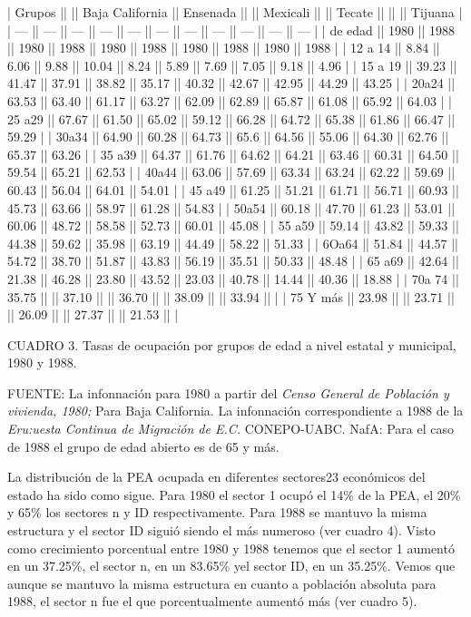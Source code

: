 \documentclass{article}
\begin{document}
| Grupos   ||       || Baja California || Ensenada ||       || Mexicali ||       || Tecate ||       ||       || Tijuana |
| ---      || ---   || ---             || ---      || ---   || ---      || ---   || ---    || ---   || ---   || ---     |
| de edad  || 1980  || 1988            || 1980     || 1988  || 1980     || 1988  || 1980   || 1988  || 1980  || 1988    |
| 12 a 14  || 8.84  || 6.06            || 9.88     || 10.04 || 8.24     || 5.89  || 7.69   || 7.05  || 9.18  || 4.96    |
| 15 a 19  || 39.23 || 41.47           || 37.91    || 38.82 || 35.17    || 40.32 || 42.67  || 42.95 || 44.29 || 43.25   |
| 20a24    || 63.53 || 63.40           || 61.17    || 63.27 || 62.09    || 62.89 || 65.87  || 61.08 || 65.92 || 64.03   |
| 25 a29   || 67.67 || 61.50           || 65.02    || 59.12 || 66.28    || 64.72 || 65.38  || 61.86 || 66.47 || 59.29   |
| 30a34    || 64.90 || 60.28           || 64.73    || 65.6  || 64.56    || 55.06 || 64.30  || 62.76 || 65.37 || 63.26   |
| 35 a39   || 64.37 || 61.76           || 64.62    || 64.21 || 63.46    || 60.31 || 64.50  || 59.54 || 65.21 || 62.53   |
| 40a44    || 63.06 || 57.69           || 63.34    || 63.24 || 62.22    || 59.69 || 60.43  || 56.04 || 64.01 || 54.01   |
| 45 a49   || 61.25 || 51.21           || 61.71    || 56.71 || 60.93    || 45.73 || 63.66  || 58.97 || 61.28 || 54.83   |
| 50a54    || 60.18 || 47.70           || 61.23    || 53.01 || 60.06    || 48.72 || 58.58  || 52.73 || 60.01 || 45.08   |
| 55 a59   || 59.14 || 43.82           || 59.33    || 44.38 || 59.62    || 35.98 || 63.19  || 44.49 || 58.22 || 51.33   |
| 6Oa64    || 51.84 || 44.57           || 54.72    || 38.70 || 51.87    || 43.83 || 56.19  || 35.51 || 50.33 || 48.48   |
| 65 a69   || 42.64 || 21.38           || 46.28    || 23.80 || 43.52    || 23.03 || 40.78  || 14.44 || 40.36 || 18.88   |
| 70a 74   || 35.75 ||                 || 37.10    ||       || 36.70    ||       || 38.09  ||       || 33.94 ||         |
| 75 Y más || 23.98 ||                 || 23.71    ||       || 26.09    ||       || 27.37  ||       || 21.53 ||         |

CUADRO 3. Tasas de ocupación por grupos de edad a nivel estatal y municipal, 1980 y 1988.

FUENTE: La infonnación para 1980 a partir del \textit{Censo General de Población y vivienda, 1980;} Para Baja California. La infonnación correspondiente a 1988 de la \textit{Eru:uesta Continua de Migración de E.C.} CONEPO-UABC. NafA: Para el caso de 1988 el grupo de edad abierto es de 65 y más.

La distribución de la PEA ocupada en diferentes sectores23 económicos del estado ha sido como sigue. Para 1980 el sector 1 ocupó el 14\% de la PEA, el 20\% y 65\% los sectores n y ID respectivamente. Para 1988 se mantuvo la misma estructura y el sector ID siguió siendo el más numeroso (ver cuadro 4). Visto como crecimiento porcentual entre 1980 y 1988 tenemos que el sector 1 aumentó en un 37.25\%, el sector n, en un 83.65\% yel sector ID, en un 35.25\%. Vemos que aunque se mantuvo la misma estructura en cuanto a población absoluta para 1988, el sector n fue el que porcentualmente aumentó más (ver cuadro 5).
\end{document}

